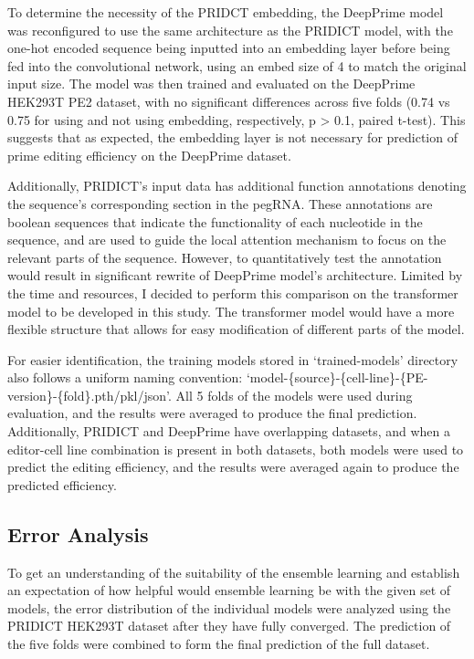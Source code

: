 To determine the necessity of the PRIDCT embedding, the DeepPrime model was reconfigured to use the same architecture as the PRIDICT model, with the one-hot encoded sequence being inputted into an embedding layer before being fed into the convolutional network, using an embed size of 4 to match the original input size. The model was then trained and evaluated on the DeepPrime HEK293T PE2 dataset, with no significant differences across five folds (0.74 vs 0.75 for using and not using embedding, respectively, p > 0.1, paired t-test). This suggests that as expected, the embedding layer is not necessary for prediction of prime editing efficiency on the DeepPrime dataset.

Additionally, PRIDICT's input data has additional function annotations denoting the sequence's corresponding section in the pegRNA. These annotations are boolean sequences that indicate the functionality of each nucleotide in the sequence, and are used to guide the local attention mechanism to focus on the relevant parts of the sequence. However, to quantitatively test the annotation would result in significant rewrite of DeepPrime model's architecture. Limited by the time and resources, I decided to perform this comparison on the transformer model to be developed in this study. The transformer model would have a more flexible structure that allows for easy modification of different parts of the model. 

For easier identification, the training models stored in `trained-models' directory also follows a uniform naming convention: `model-\{source\}-\{cell-line\}-\{PE-version\}-\{fold\}.pth/pkl/json'. All 5 folds of the models were used during evaluation, and the results were averaged to produce the final prediction. Additionally, PRIDICT and DeepPrime have overlapping datasets, and when a editor-cell line combination is present in both datasets, both models were used to predict the editing efficiency, and the results were averaged again to produce the predicted efficiency.


\subsection{Error Analysis}

To get an understanding of the suitability of the ensemble learning and establish an expectation of how helpful would ensemble learning be with the given set of models, the error distribution of the individual models were analyzed using the PRIDICT HEK293T dataset after they have fully converged. The prediction of the five folds were combined to form the final prediction of the full dataset.

